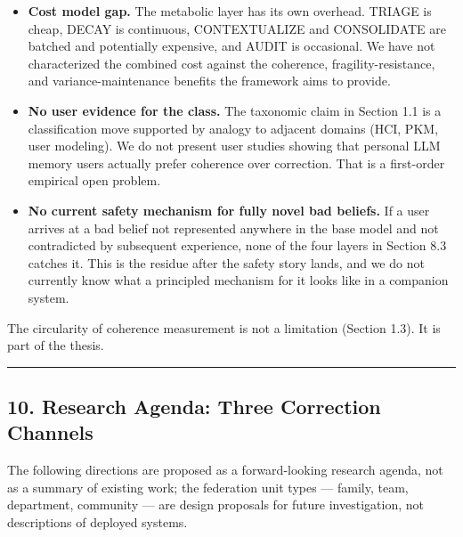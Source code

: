 \documentclass[
  11pt,
]{article}
\begin{document}
\begin{itemize}
{  summarization and adaptive hypermedia.} The idea of compressing
  content differently depending on the reader's role or task has
  established precedent in adaptive hypermedia {[}3{]} and automatic
  summarization (Nenkova \& McKeown, 2011; Mani, 2001). The framework's
  contribution is the architectural placement of this logic in the dream
  cycle, its coordination with CONSOLIDATE and TRIAGE, and its
  application at the retention-policy level for a companion-memory
  class. The concept is not novel; the coordination bundle is.
\item
  \textbf{Cost model gap.} The metabolic layer has its own overhead.
  TRIAGE is cheap, DECAY is continuous, CONTEXTUALIZE and CONSOLIDATE
  are batched and potentially expensive, and AUDIT is occasional. We
  have not characterized the combined cost against the coherence,
  fragility-resistance, and variance-maintenance benefits the framework
  aims to provide.
\item
  \textbf{No user evidence for the class.} The taxonomic claim in
  Section 1.1 is a classification move supported by analogy to adjacent
  domains (HCI, PKM, user modeling). We do not present user studies
  showing that personal LLM memory users actually prefer coherence over
  correction. That is a first-order empirical open problem.
\item
  \textbf{No current safety mechanism for fully novel bad beliefs.} If a
  user arrives at a bad belief not represented anywhere in the base
  model and not contradicted by subsequent experience, none of the four
  layers in Section 8.3 catches it. This is the residue after the safety
  story lands, and we do not currently know what a principled mechanism
  for it looks like in a companion system.
\end{itemize}

The circularity of coherence measurement is not a limitation (Section
1.3). It is part of the thesis.

\begin{center}\rule{0.5\linewidth}{0.5pt}\end{center}

\hypertarget{research-agenda-three-correction-channels}{%
\subsection{10. Research Agenda: Three Correction
Channels}\label{research-agenda-three-correction-channels}}

The following directions are proposed as a forward-looking research
agenda, not as a summary of existing work; the federation unit types ---
family, team, department, community --- are design proposals for future
investigation, not descriptions of deployed systems.
\end{document}
